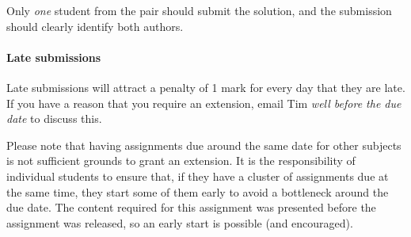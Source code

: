 \documentclass[11pt]{article}
\begin{document}
Only \emph{one} student from the pair should submit the solution, and the submission should clearly identify both authors.

\paragraph{Late submissions} Late submissions will attract a penalty of 1 mark for every day that they are late. If you have a reason that you require an extension, email Tim {\em well before the due date} to discuss this. 

Please note that having assignments due around the same date for other subjects is not sufficient grounds to grant an extension. It is the responsibility of individual students to ensure that, if they have a cluster of assignments due at the same time, they start some of them early to avoid a bottleneck around the due date. The content required for this assignment was presented before the assignment was released, so an early start is possible (and encouraged).
\end{document}
